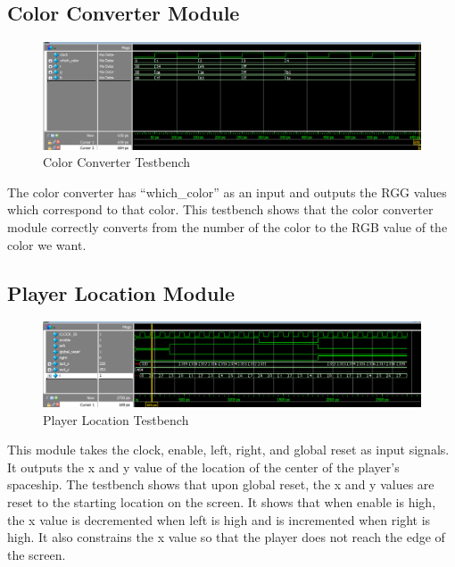 \documentclass[11pt, titlepage]{article}
\begin{document}
        \subsection{Color Converter Module}
            \begin{figure}[H]
                \centering
                \includegraphics[scale = 0.53]{Images/Testbench Color Converter .png}
                \caption{Color Converter Testbench}
            \end{figure}
            The color converter has ``which\_color'' as an input and outputs the RGG values which correspond to that color. This testbench shows that the color converter module correctly converts from the number of the color to the RGB value of the color we want.

        \subsection{Player Location Module}
            \begin{figure}[H]
                \centering
                \includegraphics[scale = 0.53]{Images/Testbench Player Location.png}
                \caption{Player Location Testbench}
            \end{figure}
            This module takes the clock, enable, left, right, and global reset as input signals. It outputs the x and y value of the location of the center of the player's spaceship. The testbench shows that upon global reset, the x and y values are reset to the starting location on the screen. It shows that when enable is high, the x value is decremented when left is high and is incremented when right is high. It also constrains the x value so that the player does not reach the edge of the screen.
\end{document}
